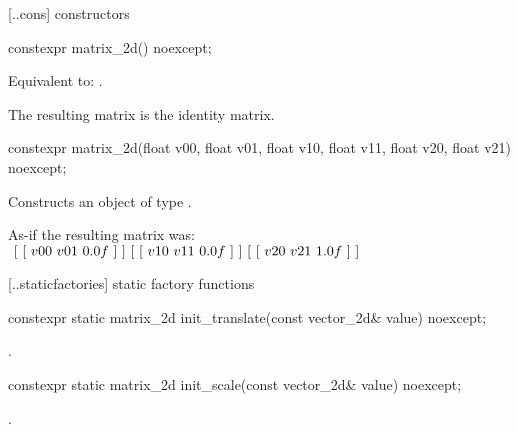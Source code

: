  [\iotwod.\matrixtwod.cons] { constructors}

%
\begin{itemdecl}
constexpr matrix_2d() noexcept;
\end{itemdecl}
\begin{itemdescr}
\pnum
\effects
Equivalent to: .

\pnum
\begin{note}
The resulting matrix is the identity matrix.
\end{note}
\end{itemdescr}

%
\begin{itemdecl}
constexpr matrix_2d(float v00, float v01, float v10, float v11,
  float v20, float v21) noexcept;
\end{itemdecl}
\begin{itemdescr}
\pnum
\effects
Constructs an object of type .

\pnum
As-if the resulting matrix was: \\
$
~[~[~v00~v01~0.0f~]~] \\
~[~[~v10~v11~0.0f~]~] \\
~[~[~v20~v21~1.0f~]~]$

\end{itemdescr}

 [\iotwod.\matrixtwod.staticfactories] { static factory 
functions}

%
\begin{itemdecl}
constexpr static matrix_2d init_translate(const vector_2d& value) noexcept;
\end{itemdecl}
\begin{itemdescr}
\pnum
\returns
{}.
\end{itemdescr}

%
\begin{itemdecl}
constexpr static matrix_2d init_scale(const vector_2d& value) noexcept;
\end{itemdecl}
\begin{itemdescr}
\pnum
\returns
{}.
\end{itemdescr}

